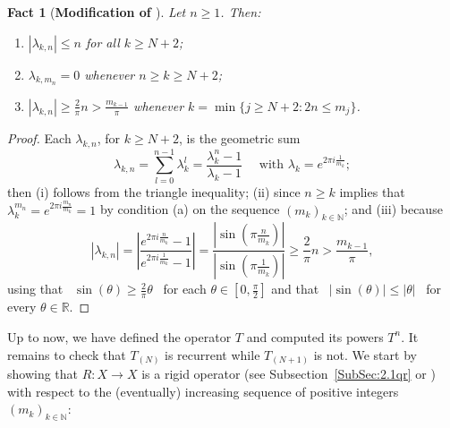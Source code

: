 \documentclass[openright,11pt]{article}
\theoremstyle{plain}
\newtheorem{fact}{Fact}[subsection]
\theoremstyle{definition}
\newcommand{\NN}{\mathbb{N}}
\newcommand{\RR}{\mathbb{R}}
\begin{document}
\begin{fact}[\textbf{Modification of \cite[Fact 3.6]{Auge2012}}]\label{Fact:lambda_k_n}
	Let $n\geq 1$. Then:
	\begin{enumerate}[{\em(i)}]
		\item $|\lambda_{k,n}| \leq n$ for all $k \geq N+2$;
		
		\item $\lambda_{k,m_n}=0$ whenever $n\geq k\geq N+2$;
		
		\item $|\lambda_{k,n}|\geq \frac{2}{\pi}n > \frac{m_{k-1}}{\pi}$ whenever $k = \min\{ j \geq N+2 : 2n \leq m_j \}$.
	\end{enumerate}
\end{fact}
\begin{proof}
	Each $\lambda_{k,n}$, for $k\geq N+2$, is the geometric sum
	\[
	\textstyle \lambda_{k,n} = \sum_{l=0}^{n-1} \lambda_k^l = \frac{\lambda_k^n-1}{\lambda_k-1} \quad \text{ with } \lambda_k = e^{2\pi i \frac{1}{m_k}};
	\]
	then (i) follows from the triangle inequality; (ii) since $n\geq k$ implies that $\lambda_k^{m_n} = e^{2\pi i \frac{m_n}{m_k}} = 1$ by condition (a) on the sequence $(m_k)_{k\in\NN}$; and (iii) because
	\[
	|\lambda_{k,n}| = \left| \frac{e^{2\pi i \frac{n}{m_k}}-1}{e^{2\pi i \frac{1}{m_k}}-1} \right| = \frac{\left| \sin(\pi \frac{n}{m_k}) \right|}{\left| \sin(\pi \frac{1}{m_k}) \right|} \geq \frac{2}{\pi} n > \frac{m_{k-1}}{\pi},
	\]
	using that \ $\sin(\theta) \geq \frac{2}{\pi} \theta$ \ for each $\theta \in [0,\frac{\pi}{2}]$ and that \ $|\sin(\theta)| \leq |\theta|$ \ for every $\theta \in \RR$.
\end{proof}

Up to now, we have defined the operator $T$ and computed its powers $T^n$. It remains to check that $T_{(N)}$ is recurrent while $T_{(N+1)}$ is not. We start by showing that $R:X\longrightarrow X$ is  a rigid operator (see Subsection~\ref{SubSec:2.1qr} or \cite[Definition 1.2]{CoMaPa2014}) with respect to the (eventually) increasing sequence of positive integers $(m_k)_{k\in\NN}$:
\end{document}
